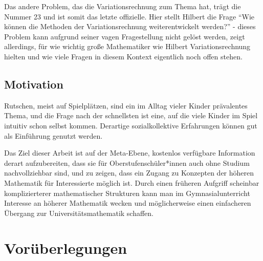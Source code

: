 Das andere Problem, das die Variationsrechnung zum Thema hat, trägt die Nummer 23 und ist somit das letzte offizielle. 
Hier stellt Hilbert die Frage "`Wie können die Methoden der Variationsrechnung weiterentwickelt werden?"' -
dieses Problem kann aufgrund seiner vagen Fragestellung nicht gelöst werden, zeigt allerdings, für wie wichtig große Mathematiker wie Hilbert Variationsrechnung hielten und wie viele Fragen in diesem Kontext eigentlich noch offen stehen.


\section{Motivation}

Rutschen, meist auf Spielplätzen, sind ein im Alltag vieler Kinder prävalentes Thema, und die Frage nach der schnellsten ist eine, auf die viele Kinder im Spiel intuitiv schon selbst kommen. 
Derartige sozialkollektive Erfahrungen können gut als Einführung genutzt werden.

Das Ziel dieser Arbeit ist auf der Meta-Ebene, kostenlos verfügbare Information derart aufzubereiten, dass sie für Oberstufenschüler*innen auch ohne Studium nachvollziehbar sind, und zu zeigen, dass ein Zugang zu Konzepten der höheren Mathematik für Interessierte möglich ist. 
Durch einen früheren Aufgriff scheinbar komplizierterer mathematischer Strukturen kann man im Gymnasialunterricht Interesse an höherer Mathematik wecken und möglicherweise einen einfacheren Übergang zur Universitätsmathematik schaffen.
\newpage

\chapter{Vorüberlegungen}
